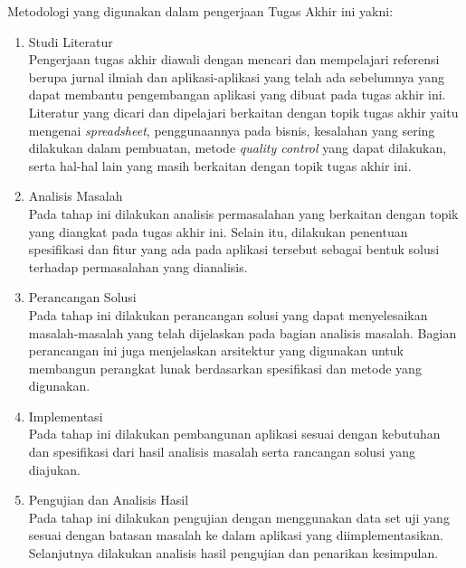 Metodologi yang digunakan dalam pengerjaan Tugas Akhir ini yakni:
\begin{enumerate}
    \item Studi Literatur \\
    Pengerjaan tugas akhir diawali dengan mencari dan mempelajari referensi berupa jurnal ilmiah dan aplikasi-aplikasi yang telah ada sebelumnya yang dapat membantu pengembangan aplikasi yang dibuat pada tugas akhir ini. Literatur yang dicari dan dipelajari berkaitan dengan topik tugas akhir yaitu mengenai \textit{spreadsheet}, penggunaannya pada bisnis, kesalahan yang sering dilakukan dalam pembuatan, metode \textit{quality control} yang dapat dilakukan, serta hal-hal lain yang masih berkaitan dengan topik tugas akhir ini. 
    
    \item Analisis Masalah \\
    Pada tahap ini dilakukan analisis permasalahan yang berkaitan dengan topik yang diangkat pada tugas akhir ini. Selain itu, dilakukan penentuan spesifikasi dan fitur yang ada pada aplikasi tersebut sebagai bentuk solusi terhadap permasalahan yang dianalisis.

    \item Perancangan Solusi \\
    Pada tahap ini dilakukan perancangan solusi yang dapat menyelesaikan masalah-masalah yang telah dijelaskan pada bagian analisis masalah. Bagian perancangan ini juga menjelaskan arsitektur yang digunakan untuk membangun perangkat lunak berdasarkan spesifikasi dan metode yang digunakan.

    \item Implementasi \\
    Pada tahap ini dilakukan pembangunan aplikasi sesuai dengan kebutuhan dan spesifikasi dari hasil analisis masalah serta rancangan solusi yang diajukan.

    \item Pengujian dan Analisis Hasil \\
    Pada tahap ini dilakukan pengujian dengan menggunakan data set uji yang sesuai dengan batasan masalah ke dalam aplikasi yang diimplementasikan. Selanjutnya dilakukan analisis hasil pengujian dan penarikan kesimpulan.

\end{enumerate}


